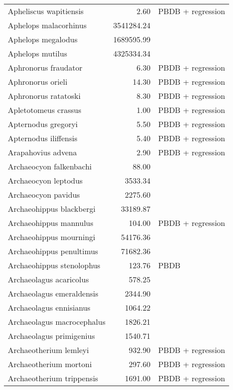 \begin{table}[ht]
\begin{tabular}{lrl}
  Apheliscus wapitiensis & 2.60 & PBDB + regression \\ 
  Aphelops malacorhinus & 3541284.24 & \cite{Tomiya2013} \\ 
  Aphelops megalodus & 1689595.99 & \cite{Tomiya2013} \\ 
  Aphelops mutilus & 4325334.34 & \cite{Tomiya2013} \\ 
  Aphronorus fraudator & 6.30 & PBDB + regression \\ 
  Aphronorus orieli & 14.30 & PBDB + regression \\ 
  Aphronorus ratatoski & 8.30 & PBDB + regression \\ 
  Apletotomeus crassus & 1.00 & PBDB + regression \\ 
  Apternodus gregoryi & 5.50 & PBDB + regression \\ 
  Apternodus iliffensis & 5.40 & PBDB + regression \\ 
  Arapahovius advena & 2.90 & PBDB + regression \\ 
  Archaeocyon falkenbachi & 88.00 & \cite{Stirton1932} \\ 
  Archaeocyon leptodus & 3533.34 & \cite{Tomiya2013} \\ 
  Archaeocyon pavidus & 2275.60 & \cite{Tomiya2013} \\ 
  Archaeohippus blackbergi & 33189.87 & \cite{Tomiya2013} \\ 
  Archaeohippus mannulus & 104.00 & PBDB + regression \\ 
  Archaeohippus mourningi & 54176.36 & \cite{Tomiya2013} \\ 
  Archaeohippus penultimus & 71682.36 & \cite{Tomiya2013} \\ 
  Archaeohippus stenolophus & 123.76 & PBDB \\ 
  Archaeolagus acaricolus & 578.25 & \cite{Tomiya2013} \\ 
  Archaeolagus emeraldensis & 2344.90 & \cite{Tomiya2013} \\ 
  Archaeolagus ennisianus & 1064.22 & \cite{Tomiya2013} \\ 
  Archaeolagus macrocephalus & 1826.21 & \cite{Tomiya2013} \\ 
  Archaeolagus primigenius & 1540.71 & \cite{Tomiya2013} \\ 
  Archaeotherium lemleyi & 932.90 & PBDB + regression \\ 
  Archaeotherium mortoni & 297.60 & PBDB + regression \\ 
  Archaeotherium trippensis & 1691.00 & PBDB + regression \\ 

\end{tabular}
\end{table}
